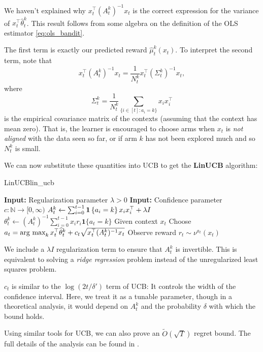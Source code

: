 \documentclass[\main/main]{subfiles}
\begin{document}
\begin{exercise}
    We haven't explained why $x_t^\top (A_t^k)^{-1} x_t$ is the correct expression for the variance of $x_t^\top \hat \theta_t^k$. This result follows from some algebra on the definition of the OLS estimator \eqref{eq:ols_bandit}.
\end{exercise}

The first term is exactly our predicted reward $\hat \mu^k_t(x_t)$.
To interpret the second term, note that \[
    x_t^\top (A_t^k)^{-1} x_t = \frac{1}{N_t^k} x_t^\top (\Sigma_t^k)^{-1} x_t,
\]
where \[ \Sigma_t^k = \frac{1}{N_t^k} \sum_{\{ i \in [t] : a_i = k \}} x_i x_i^\top \]
is the empirical covariance matrix of the contexts (assuming that the context has mean zero).
That is, the learner is encouraged to choose arms when $x_t$ is \emph{not aligned} with the data seen so far,
or if arm $k$ has not been explored much and so $N_t^k$ is small.

We can now substitute these quantities into UCB to get the \textbf{LinUCB} algorithm:

\begin{definition}{LinUCB}{lin_ucb}
    \begin{algorithmic}
        \State \textbf{Input:} Regularization parameter $\lambda > 0$
        \State \textbf{Input:} Confidence parameter $c : \mathbb{N} \to [0, \infty)$
        \State $A_t^k \gets \sum_{i=0}^{t-1} \mathbf{1}\left\{a_i = k\right\} x_i x_i^\top + \lambda I$
        \State $\theta_t^k \gets (A_t^k)^{-1} \sum_{i=0}^{t-1} x_i r_i \mathbf{1} \{ a_t = k \}$
        \EndFor
        \State Given context $x_t$
        \State Choose $a_t = \operatorname*{\textrm{arg\ max}}_k x_t^\top \widehat \theta_t^k + c_t \sqrt{x_t^\top (A_t^k)^{-1} x_t}$
        \State Observe reward $r_t \sim \nu^{a_t}(x_t)$
        \EndFor
    \end{algorithmic}
    We include a $\lambda I$ regularization term to ensure that $A_t^k$ is invertible. This is equivalent to solving a \emph{ridge regression} problem instead of the unregularized least squares problem.

    $c_t$ is similar to the $\log (2t/\delta')$ term of UCB: It controls the width of the confidence interval. Here, we treat it as a tunable parameter, though in a theoretical analysis, it would depend on $A_t^k$ and the probability $\delta$ with which the bound holds.
\end{definition}

Using similar tools for UCB, we can also prove an $\tilde{O}(\sqrt{T})$ regret bound. The full details of the analysis can be found in \cite[Section 6.3]{agarwal_reinforcement_2022}.
\end{document}
